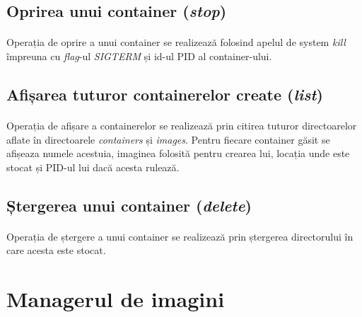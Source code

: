         \subsection{Oprirea unui container (\textit{stop})}
            \paragraph{} Operația de oprire a unui container se realizează folosind apelul de system \textit{kill} împreuna cu \textit{flag}-ul \textit{SIGTERM} și id-ul PID al container-ului.

        \subsection{Afișarea tuturor containerelor create (\textit{list})}
            \paragraph{} Operația de afișare a containerelor se realizează prin citirea tuturor directoarelor aflate în directoarele \textit{containers} și \textit{images}. Pentru fiecare container găsit se afișeaza numele acestuia, imaginea folosită pentru crearea lui, locația unde este stocat și PID-ul lui dacă acesta rulează.

        \subsection{Ștergerea unui container (\textit{delete})}
        \paragraph{} Operația de ștergere a unui container se realizează prin ștergerea directorului în care acesta este stocat.

    \section{Managerul de imagini}
